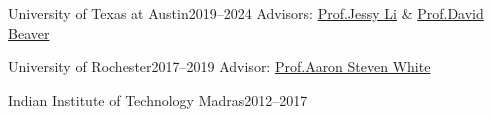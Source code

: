     {University of Texas at Austin}{2019--2024}
\vspace{0.15em}
Advisors: \href{https://jessyli.com}{Prof.Jessy Li} \& \href{https://liberalarts.utexas.edu/linguistics/faculty/dib97}{Prof.David Beaver}

\vspace{0.15em}

    {University of Rochester}{2017--2019}
\vspace{0.15em}
Advisor: \href{http://aaronstevenwhite.io}{Prof.Aaron Steven White}

\vspace{0.15em}

    {Indian Institute of Technology Madras}{2012--2017}
\vspace{0.75em}

